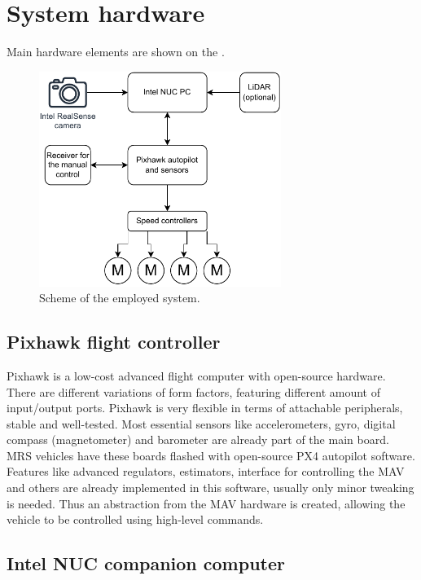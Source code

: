 \section{System hardware}

Main hardware elements are shown on the . 

\begin{figure}[!h]
  \centering
  \includegraphics[width=0.7\textwidth]{./fig/photos/system.pdf}
  \caption{Scheme of the employed system.}
  \label{fig:system}
\end{figure}

\subsection{Pixhawk flight controller}

Pixhawk is a low-cost advanced flight computer with open-source hardware. There are different variations of form factors, featuring different amount of input/output ports. Pixhawk is very flexible in terms of attachable peripherals, stable and well-tested. Most essential sensors like accelerometers, gyro, digital compass (magnetometer) and barometer are already part of the main board. \acs{MRS} vehicles have these boards flashed with open-source PX4 autopilot software. Features like advanced regulators, estimators, interface for controlling the \acs{MAV} and others are already implemented in this software, usually only minor tweaking is needed. Thus an abstraction from the \acs{MAV} hardware is created, allowing the vehicle to be controlled using high-level commands.


\subsection{Intel NUC companion computer}

